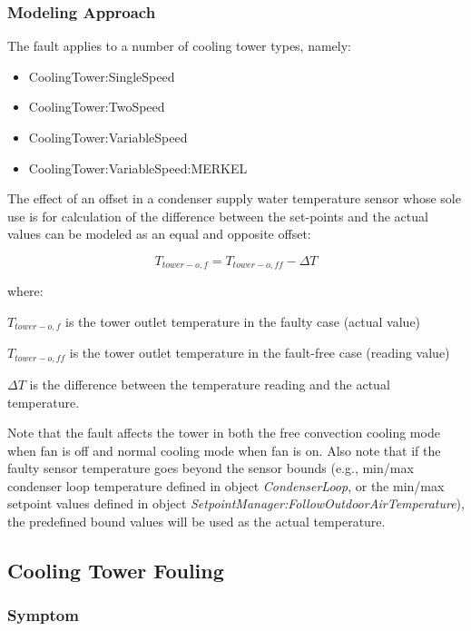 \subsubsection{Modeling Approach}

The fault applies to a number of cooling tower types, namely:

\begin{itemize}
\tightlist
\item
  CoolingTower:SingleSpeed
\item
  CoolingTower:TwoSpeed
\item
  CoolingTower:VariableSpeed
\item
  CoolingTower:VariableSpeed:MERKEL
\end{itemize}

The effect of an offset in a condenser supply water temperature sensor whose sole use is for calculation of the difference between the set-points and the actual values can be modeled as an equal and opposite offset: 

\begin{equation}
T_{tower-o,f} = T_{tower-o,ff} - \Delta T
\end{equation}

where:

\(T_{tower-o,f}\) is the tower outlet temperature in the faulty case (actual value)

\(T_{tower-o,ff}\) is the tower outlet temperature in the fault-free case (reading value)

\(\Delta T\) is the difference between the temperature reading and the actual temperature.

Note that the fault affects the tower in both the free convection cooling mode when fan is off and normal cooling mode when fan is on. Also note that if the faulty sensor temperature goes beyond the sensor bounds (e.g., min/max condenser loop temperature defined in object \emph{CondenserLoop}, or the min/max setpoint values defined in object \emph{SetpointManager:FollowOutdoorAirTemperature}), the predefined bound values will be used as the actual temperature.


\subsection{Cooling Tower Fouling}\label{cooling-tower-fouling}

\subsubsection{Symptom}


